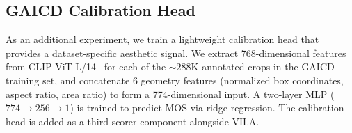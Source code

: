 \subsection{GAICD Calibration Head}
\label{sec:calhead}

As an additional experiment, we train a lightweight calibration head
that provides a dataset-specific aesthetic signal.  We extract 768-dimensional
features from CLIP ViT-L/14~\cite{clip2021} for each of the ${\sim}288$K
annotated crops in the GAICD training set, and concatenate 6 geometry
features (normalized box coordinates, aspect ratio, area ratio) to form a
774-dimensional input.  A two-layer MLP ($774 \to 256 \to 1$) is trained
to predict MOS via ridge regression.  The calibration head is added as
a third scorer component alongside VILA.


